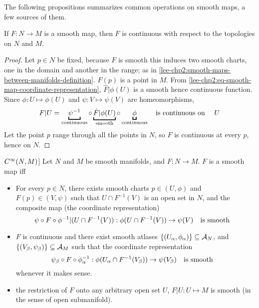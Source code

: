 \documentclass[../main-manifolds.tex]{subfiles}
\begin{document}
The following propositions summarizes common operations on smooth maps, a few sources of them.
\begin{wts}\label{lee-chp2:smooth-maps-are-continuous}
    If $F:N\to M$ is a smooth map, then $F$ is continuous with respect to the topologies on $N$ and $M$.
\end{wts}
\begin{proof}
    Let $p\in N$ be fixed, because $F$ is smooth this induces two smooth charts, one in the domain and another in the range; as in \cref{lee-chp2:smooth-maps-between-manifolds-definition}. $F(p)$ is a point in $M$. From \cref{lee-chp2:eq-smooth-map-coordinate-representation}, $\hat{F}|\phi(U)$ is a smooth hence continuous function. Since $\phi: U\mapsto \phi(U)$ and $\psi: V\mapsto \psi(V)$ are homeomorphisms, 
    \[
        F|U = \underbracket{\psi^{-1}}_{\text{continuous}}\circ \underbracket{\hat{F}|\phi(U)}_{\text{smooth}}\circ \underbracket{\phi}_{\text{continuous}}\qq{is continuous on }U
    \]
    Let the point $p$ range through all the points in $N$, so $F$ is continuous at every $p$, hence on $N$.
\end{proof}
\begin{wts}{$\cinf[N,M]$}]\label{lee-chp2:characterizations-of-smooth-maps}
    Let $N$ and $M$ be smooth manifolds, and $F:N\to M$. $F$ is a smooth map iff
    \begin{itemize}
        \item For every $p\in N$, there exists smooth charts $p\in (U,\phi)$ and $F(p)\in (V,\psi)$ such that $U\cap F^{-1}(V)$ is an open set in $N$, and the composite map (the coordinate representation)
        \[
            \psi\circ F\circ \phi^{-1}|(U\cap F^{-1}(V)):\phi(U\cap F^{-1}(V))\to \psi(V)\qq{is smooth}
        \]
        \item $F$ is continuous and there exist smooth atlases $\{(U_\alpha,\phi_\alpha)\}\subseteq\mathcal{A}_N$, and $\{(V_\beta,\psi_\beta)\}\subseteq\mathcal{A}_M$ such that the coordinate representation 
        \[
            \psi_\beta\circ F\circ \phi_\alpha^{-1}:\phi(U_\alpha\cap F^{-1}(V_\beta))\to \psi(V_\beta)\qq{is smooth}
        \]
        whenever it makes sense.
        \item the restriction of $F$ onto any arbitrary open set $U$, $F|U: U\mapsto M$ is smooth (in the sense of open submanifold).
    \end{itemize}
\end{wts}
\end{document}
